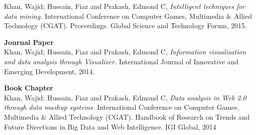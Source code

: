 \documentclass[12pt, oneside]{Thesis} %
\begin{document}
Khan, Wajid; Hussain, Fiaz and Prakash, Edmond C, \textit{Intelligent techniques for data mining.} International Conference on Computer Games, Multimedia & Allied Technology (CGAT). Proceedings. Global Science and Technology Forum, 2015.

\textbf{Journal Paper}\\
Khan, Wajid; Hussain, Fiaz and Prakash, Edmond C, \textit{Information visualisation and data analysis through Visualixer.} International Journal of Innovative and Emerging Development, 2014. 


\textbf{Book Chapter}\\
Khan, Wajid; Hussain, Fiaz and Prakash, Edmond C, \textit{Data analysis in Web 2.0 through data mashup systems.} International Conference on Computer Games, Multimedia & Allied Technology (CGAT). Handbook of Research on Trends and Future Directions in Big Data and Web Intelligence. IGI Global, 2014


\clearpage %

\mainmatter %

\pagestyle{fancy} %





 
 
 
 



\backmatter


\label{Bibliography}


\end{document}
